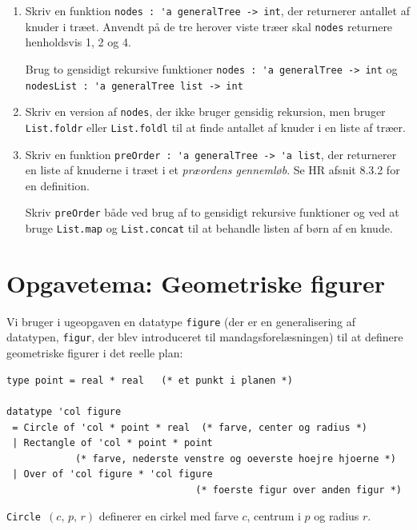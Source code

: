 \documentclass[a4paper,12pt]{article}
\begin{document}
\begin{enumerate}[{5}F1]
\item Skriv en funktion \lstinline{nodes : 'a generalTree -> int}, der
  returnerer antallet af knuder i træet.  Anvendt på de tre herover
  viste træer skal \lstinline{nodes} returnere henholdsvis 1, 2 og 4.

  Brug to gensidigt rekursive funktioner
  \lstinline{nodes : 'a generalTree -> int} og\newline
  \lstinline{nodesList : 'a generalTree list -> int}

\item Skriv en version af \lstinline{nodes}, der ikke bruger gensidig
  rekursion, men bruger \lstinline{List.foldr} eller
  \lstinline{List.foldl} til at finde antallet af knuder i en liste af
  træer.

\item Skriv en funktion \lstinline{preOrder : 'a generalTree -> 'a list}, der
  returnerer en liste af knuderne i træet i et \emph{præordens
    gennemløb}.  Se HR afsnit 8.3.2 for en definition.

  Skriv \lstinline{preOrder} både ved brug af to gensidigt rekursive
  funktioner og ved at bruge \lstinline{List.map} og
  \lstinline{List.concat} til at behandle listen af børn af en knude.

\end{enumerate}

\newpage
\section{Opgavetema: Geometriske figurer}\label{tema}

Vi bruger i ugeopgaven en datatype \lstinline{figure} (der er en
generalisering af datatypen, \lstinline{figur}, der blev introduceret
til mandagsforelæsningen) til at definere geometriske figurer i det
reelle plan:

\begin{lstlisting}
type point = real * real   (* et punkt i planen *)

datatype 'col figure
 = Circle of 'col * point * real  (* farve, center og radius *)
 | Rectangle of 'col * point * point
            (* farve, nederste venstre og oeverste hoejre hjoerne *)
 | Over of 'col figure * 'col figure
                                 (* foerste figur over anden figur *)
\end{lstlisting}

\lstinline{Circle }$(c,\,p,\,r)$ definerer en cirkel med farve $c$,
centrum i $p$ og radius $r$.
\end{document}
